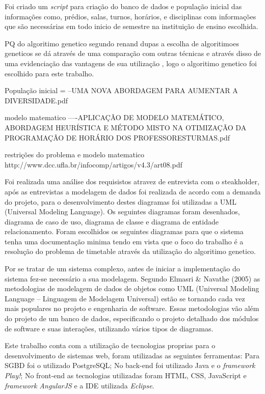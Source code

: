 Foi criado um \textit{script} para criação do banco de dados e população inicial das informações como, prédios, salas, turnos, horários, e disciplinas com informações que são necessárias em todo inicio de semestre na instituição de ensino escolhida.

PQ do algoritimo genetico
segundo renand dupas a escolha de algoritimoes geneticos se dá através de uma comparação com outras técnicas e através disso de uma evidenciação das vantagens de sua utilização , logo o algoritimo genetico foi escolhido para este trabalho.

População inicial = --UMA NOVA ABORDAGEM PARA AUMENTAR A DIVERSIDADE.pdf

modelo matematico ----APLICAÇÃO DE MODELO MATEMÁTICO, ABORDAGEM HEURÍSTICA E MÉTODO MISTO NA OTIMIZAÇÃO DA PROGRAMAÇÃO DE HORÁRIO DOS PROFESSORESTURMAS.pdf

restrições do problema e modelo matematico http://www.dcc.ufla.br/infocomp/artigos/v4.3/art08.pdf

Foi realizada uma análise dos requisistos atravez de entrevista com o steakholder, após as entrevistas a modelagem de dados foi realizada de acordo com a demanda do projeto, para o desenvolvimento destes diagramas foi utilizadas a UML (Universal Modeling Language). Os seguintes diagramas foram desenhados, diagrama de caso de uso, diagrama de classe e diagrama de entidade relacionamento. Foram escolhidos os seguintes diagramas para que o sistema tenha uma documentação minima tendo em vista que o foco do trabalho é a resolução do problema de timetable através da utilização do algoritimo genetico.

Por se tratar de um sistema complexo, antes de iniciar a implementação do sistema
fez-se necessário a sua modelagem. Segundo Elmasri & Navathe (2005) as metodologias
de modelagem de dados de objetos como UML (Universal Modeling Language –
Linguagem de Modelagem Universal) estão se tornando cada vez mais populares no
projeto e engenharia de software. Essas metodologias vão além do projeto de um banco de
dados, especificando o projeto detalhado dos módulos de software e suas interações,
utilizando vários tipos de diagramas.\par


Este trabalho conta com a utilização de tecnologias proprias para o desenvolvimento de sistemas web, foram utilizadas as seguintes ferramentas: Para SGBD foi o utilizado PostgreSQL; No back-end foi utilizado Java e o \textit{framework Play!}; No front-end as tecnologias utilizadas foram HTML, CSS, JavaScript e \textit{framework AngularJS} e a IDE utilizada \textit{Eclipse}.\par



